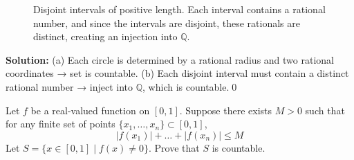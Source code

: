 \begin{figure}[h]
\centering
{}
\caption{Disjoint intervals of positive length. Each interval contains a rational number, and since the intervals are disjoint, these rationals are distinct, creating an injection into $\mathbb{Q}$.}
\end{figure}

\bigskip\noindent\textbf{Solution:}  
(a) Each circle is determined by a rational radius and two rational coordinates → set is countable.  
(b) Each disjoint interval must contain a distinct rational number → inject into \( \mathbb{Q} \), which is countable.\qed



\begin{problembox}
\begin{problemstatement}
Let \( f \) be a real-valued function on \( [0,1] \). Suppose there exists \( M > 0 \) such that for any finite set of points \( \{x_1, \dots, x_n\} \subset [0,1] \),  
\[
|f(x_1)| + \dots + |f(x_n)| \le M
\]  
Let \( S = \{x \in [0,1] \mid f(x) \ne 0\} \). Prove that \( S \) is countable.
\end{problemstatement}
\end{problembox}

